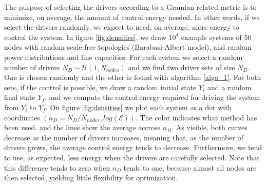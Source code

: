 \documentclass[conference]{IEEEtran}
\begin{document}



The purpose of selecting the drivers according to a Gramian related metric is to minimize, on average, the amount of control energy needed. In other words, if we select the drivers randomly, we expect to need, on average, more energy to control the system. In figure \ref{fig:densities}, we draw $10^4$ example systems of 50 nodes with random scale-free topologies (Barabasi-Albert model), and random power distributions and line capacities.  For each system we select a random number of drivers $N_D \sim \mathcal{U}(1,N_{nodes}) $ and we find two driver sets of size $N_D $. One is chosen randomly and the other is found with algorithm \ref{algo_1}. For both sets, if the control is possible, we draw a random initial state $Y_i$ and a random final state $Y_f$, and we compute the control energy required for driving the system from $Y_i$ to $Y_f$. On figure \ref{fig:densities} we plot each system as a dot with coordinates $(n_D = N_D / N_{nodes}, log(\mathcal{E}))$. The color indicates what method has been used, and the lines show the average accross $n_D$. As visible, both curves decrease as the number of drivers increases, meaning that, as the number of drivers grows, the average control energy tends to decrease. Furthermore, we tend to use, as expected, less energy when the drivers are carefully selected. Note that this difference tends to zero when $n_D$ tends to one, because almost all nodes are then selected, yielding little flexibility for optimization.
\end{document}
